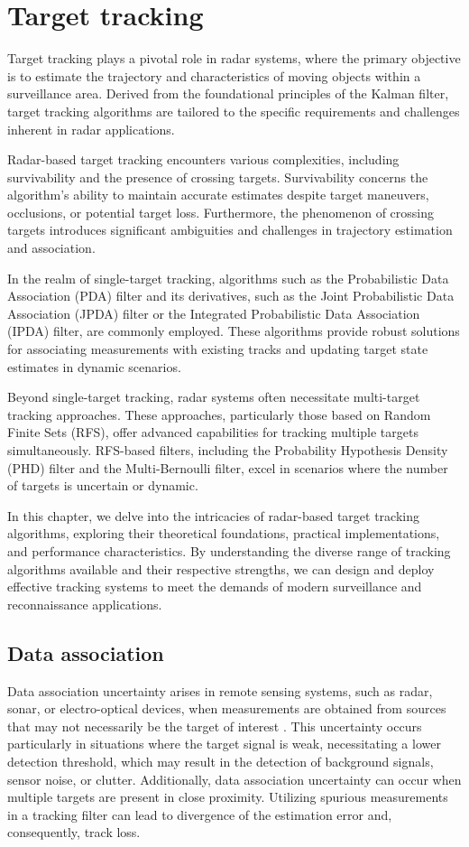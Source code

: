 \chapter{Target tracking}
Target tracking plays a pivotal role in radar systems, where the primary objective is to estimate the trajectory and characteristics of moving objects within a surveillance area. Derived from the foundational principles of the Kalman filter, target tracking algorithms are tailored to the specific requirements and challenges inherent in radar applications.

Radar-based target tracking encounters various complexities, including survivability and the presence of crossing targets. Survivability concerns the algorithm's ability to maintain accurate estimates despite target maneuvers, occlusions, or potential target loss. Furthermore, the phenomenon of crossing targets introduces significant ambiguities and challenges in trajectory estimation and association.

In the realm of single-target tracking, algorithms such as the Probabilistic Data Association (PDA) filter and its derivatives, such as the Joint Probabilistic Data Association (JPDA) filter or the Integrated Probabilistic Data Association (IPDA) filter, are commonly employed. These algorithms provide robust solutions for associating measurements with existing tracks and updating target state estimates in dynamic scenarios.

Beyond single-target tracking, radar systems often necessitate multi-target tracking approaches. These approaches, particularly those based on Random Finite Sets (RFS), offer advanced capabilities for tracking multiple targets simultaneously. RFS-based filters, including the Probability Hypothesis Density (PHD) filter and the Multi-Bernoulli filter, excel in scenarios where the number of targets is uncertain or dynamic.

In this chapter, we delve into the intricacies of radar-based target tracking algorithms, exploring their theoretical foundations, practical implementations, and performance characteristics. By understanding the diverse range of tracking algorithms available and their respective strengths, we can design and deploy effective tracking systems to meet the demands of modern surveillance and reconnaissance applications.

\section{Data association}
\label{sec:data_association}
Data association uncertainty arises in remote sensing systems, such as radar, sonar, or electro-optical devices, when
measurements are obtained from sources that may not necessarily be the target of interest \cite{BarShalomPDA}. This uncertainty
occurs particularly in situations where the target signal is weak, necessitating a lower detection threshold, which may result in the detection of background signals, sensor noise, or clutter. Additionally, data association uncertainty can occur when multiple targets are present in close proximity. Utilizing spurious measurements in a tracking filter can lead to divergence of the estimation error and, consequently, track loss.

